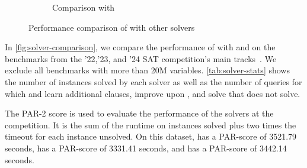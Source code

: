 \begin{figure}[!t]
\begin{subfigure}[t]{0.45\textwidth}
        \caption{Comparison with \prelearn}
        \label{fig:cautical-vs-prelearn}
    \end{subfigure}
    \caption{Performance comparison of \tool with other solvers}
    \label{fig:solver-comparison}
\end{figure}

In \autoref{fig:solver-comparison}, we compare the performance of \tool with \cadical and \prelearn on the benchmarks from the '22,'23, and '24 SAT competition's main tracks~\cite{satcomp2022,satcomp2023,satcomp2024}. We exclude all benchmarks with more than 20M variables. \autoref{tab:solver-stats} shows the number of instances solved by each solver as well as the number of queries for which \prelearn and \cadical learn additional clauses, improve upon \cadical, and solve that \cadical does not solve.

The PAR-2 score is used to evaluate the performance of the solvers at the competition. It is the sum of the runtime on instances solved plus two times the timeout for each instance unsolved. On this dataset, \cadical has a PAR-score of 3521.79 seconds, \prelearn has a PAR-score of 3331.41 seconds, and \tool has a PAR-score of 3442.14 seconds.


